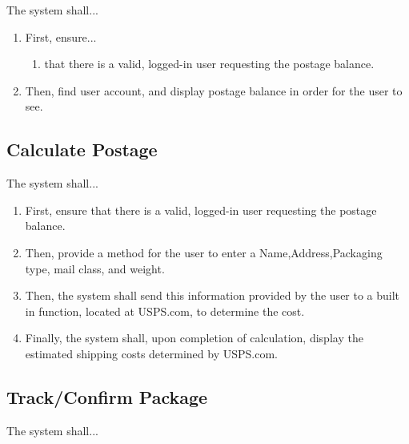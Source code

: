 \documentclass{scrreprt}
\begin{document}
The system shall...

\begin{enumerate}
\item First, ensure...
\begin{enumerate}
\item that there is a valid, logged-in user requesting the postage balance.
\end{enumerate}
\item Then, find user account, and display postage balance in order for the
user to see.
\end{enumerate}

\subsection{Calculate Postage}

The system shall...

\begin{enumerate}
\item First, ensure that there is a valid, logged-in user requesting the
postage balance.  
\item Then, provide a method for the user to enter a Name,Address,Packaging
type, mail class, and weight.
\item Then, the system shall send this information provided by the user to a
built in function, located at USPS.com, to determine the cost.  
\item Finally, the system shall, upon completion of calculation, display the
estimated shipping costs determined by USPS.com.
\end{enumerate}

\subsection{Track/Confirm Package}

The system shall...
\end{document}
